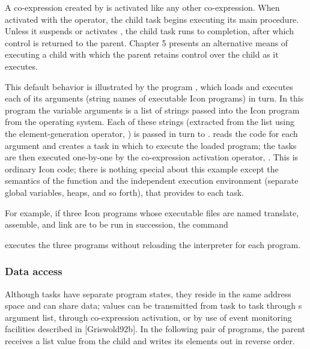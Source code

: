 A co-expression created by  is
activated like any other co-expression. When activated with the
 operator, the child task begins
executing its main procedure. Unless it suspends or activates
, the child task runs to
completion, after which control is returned to the parent. Chapter 5
presents an alternative means of executing a child with which the
parent retains control over the child as it executes. 

This default behavior is illustrated by the program
, which loads and executes each
of its arguments (string names of executable Icon programs) in turn. In
this program the variable arguments is a list of strings passed into
the Icon program from the operating system. Each of these strings
(extracted from the list using the element-generation operator,
\textstyleSourceText{\textsf{!}}) is passed in turn to
\textsf{.
} reads the code for each argument
and creates a task in which to execute the loaded program; the tasks
are then executed one-by-one by the co-expression activation operator,
. This is ordinary Icon code; there is
nothing special about this example except the semantics of the
 function and the independent
execution environment (separate global variables, heaps, and so forth),
that \textstyleSourceText{
}provides to each task. 


For example, if three Icon programs whose executable files are named
translate, assemble, and link are to be run in succession, the command 


\noindent
executes the three programs without reloading the interpreter for each
program. 

\subsubsection{Data access}

Although tasks have separate program states, they reside in the same
address space and can share data; values can be transmitted from task
to task through
s argument list,
through co-expression activation, or by use of event monitoring
facilities described in [Griswold92b]. In the following pair of
programs, the parent receives a list value from the child and writes
its elements out in reverse order. 

